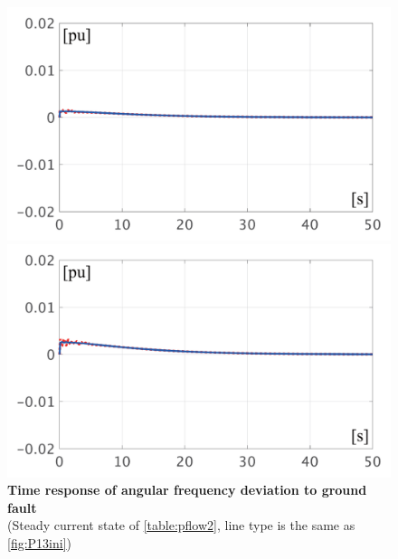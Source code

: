 \documentclass[graybox, envcountchap]{svmult}
\begin{document}
\begin{figure}[t]
  \centering
  {
  \begin{minipage}{0.49\linewidth}
    \centering
    \includegraphics[width = 1.0\linewidth]{figs/50mP3}
  \end{minipage}
  \begin{minipage}{0.49\linewidth}
    \centering
    \includegraphics[width = 1.0\linewidth]{figs/100mP3}
  \end{minipage}
  \medskip
  \caption{\textbf{Time response of angular frequency deviation to ground fault}
  \\ \centering (Steady current state of \ref{table:pflow2}, line type is the same as \ref{fig:P13ini})}
  \label{fig:P3fault}
  }
\medskip
\end{figure}
\end{document}
